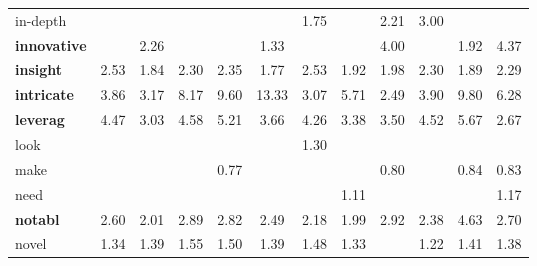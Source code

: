 \begin{tabular}{|l|c|c|c|c|c|c|c|c|c|c|c|}
in-depth &  &  &  &  &  & \cellcolor{green!31} 1.75 &  & \cellcolor{green!44} 2.21 & \cellcolor{green!61} 3.00 &  &  \\
\textbf{innovative} &  & \cellcolor{green!45} 2.26 &  &  & \cellcolor{green!15} 1.33 &  &  & \cellcolor{green!77} 4.00 &  & \cellcolor{green!36} 1.92 & \cellcolor{green!82} 4.37 \\
\textbf{insight} & \cellcolor{green!51} 2.53 & \cellcolor{green!34} 1.84 & \cellcolor{green!46} 2.30 & \cellcolor{green!47} 2.35 & \cellcolor{green!31} 1.77 & \cellcolor{green!51} 2.53 & \cellcolor{green!36} 1.92 & \cellcolor{green!38} 1.98 & \cellcolor{green!46} 2.30 & \cellcolor{green!35} 1.89 & \cellcolor{green!46} 2.29 \\
\textbf{intricate} & \cellcolor{green!75} 3.86 & \cellcolor{green!64} 3.17 & \cellcolor{green!100} 8.17 & \cellcolor{green!100} 9.60 & \cellcolor{green!100} 13.33 & \cellcolor{green!62} 3.07 & \cellcolor{green!97} 5.71 & \cellcolor{green!50} 2.49 & \cellcolor{green!75} 3.90 & \cellcolor{green!100} 9.80 & \cellcolor{green!100} 6.28 \\
\textbf{leverag} & \cellcolor{green!83} 4.47 & \cellcolor{green!61} 3.03 & \cellcolor{green!84} 4.58 & \cellcolor{green!92} 5.21 & \cellcolor{green!72} 3.66 & \cellcolor{green!80} 4.26 & \cellcolor{green!67} 3.38 & \cellcolor{green!69} 3.50 & \cellcolor{green!84} 4.52 & \cellcolor{green!96} 5.67 & \cellcolor{green!54} 2.67 \\
look &  &  &  &  &  & \cellcolor{green!14} 1.30 &  &  &  &  &  \\
make &  &  &  & \cellcolor{red!51} 0.77 &  &  &  & \cellcolor{red!43} 0.80 &  & \cellcolor{red!34} 0.84 & \cellcolor{red!36} 0.83 \\
need &  &  &  &  &  &  & \cellcolor{green!5} 1.11 &  &  &  & \cellcolor{green!8} 1.17 \\
\textbf{notabl} & \cellcolor{green!53} 2.60 & \cellcolor{green!38} 2.01 & \cellcolor{green!59} 2.89 & \cellcolor{green!57} 2.82 & \cellcolor{green!50} 2.49 & \cellcolor{green!43} 2.18 & \cellcolor{green!38} 1.99 & \cellcolor{green!59} 2.92 & \cellcolor{green!48} 2.38 & \cellcolor{green!85} 4.63 & \cellcolor{green!55} 2.70 \\
novel & \cellcolor{green!16} 1.34 & \cellcolor{green!18} 1.39 & \cellcolor{green!24} 1.55 & \cellcolor{green!22} 1.50 & \cellcolor{green!18} 1.39 & \cellcolor{green!21} 1.48 & \cellcolor{green!15} 1.33 &  & \cellcolor{green!11} 1.22 & \cellcolor{green!19} 1.41 & \cellcolor{green!17} 1.38 \\

\end{tabular}
